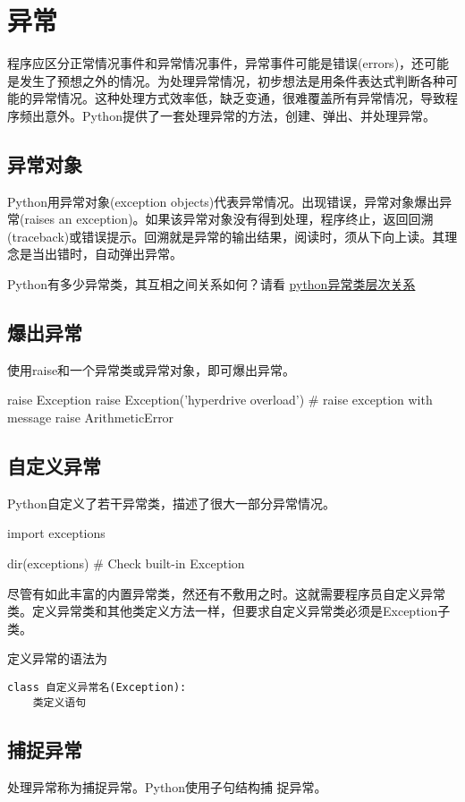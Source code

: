 \chapter{异常}
程序应区分正常情况事件和异常情况事件，异常事件可能是错误(errors)，还可能是发生了预想之外的情况。为处理异常情况，初步想法是用条件表达式判断各种可能的异常情况。这种处理方式效率低，缺乏变通，很难覆盖所有异常情况，导致程序频出意外。Python提供了一套处理异常的方法，创建、弹出、并处理异常。
\section{异常对象}
Python用异常对象(exception objects)代表异常情况。出现错误，异常对象爆出异常(raises an exception)。如果该异常对象没有得到处理，程序终止，返回回溯(traceback)或错误提示。回溯就是异常的输出结果，阅读时，须从下向上读。其理念是当出错时，自动弹出异常。

Python有多少异常类，其互相之间关系如何？请看
\href{https://docs.python.org/3/library/exceptions.html#exception-hierarchy}{python异常类层次关系}
\section{爆出异常}
使用raise和一个异常类或异常对象，即可爆出异常。

\begin{python}
  raise Exception
  raise Exception('hyperdrive overload')  # raise exception with message
  raise ArithmeticError
\end{python}
\section{自定义异常}
Python自定义了若干异常类，描述了很大一部分异常情况。
\begin{python}
import exceptions

dir(exceptions)  # Check built-in Exception
\end{python}
尽管有如此丰富的内置异常类，然还有不敷用之时。这就需要程序员自定义异常
类。定义异常类和其他类定义方法一样，但要求自定义异常类必须是Exception子
类。

定义异常的语法为
\begin{verbatim}
class 自定义异常名(Exception):
    类定义语句
\end{verbatim}
\section{捕捉异常}
处理异常称为捕捉异常。Python使用子句结构捕
捉异常。
